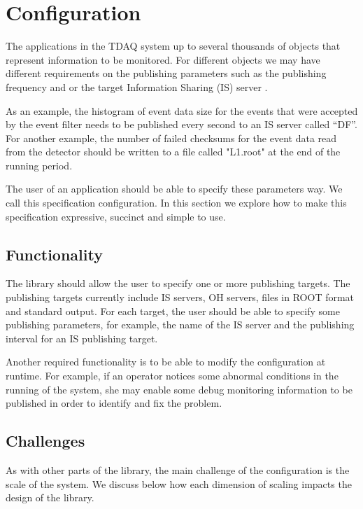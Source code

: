 \chapter{Configuration} %
\label{Capitolul3}

The applications in the TDAQ system up to several thousands of objects that represent information to be monitored. For different objects we may have different requirements on the publishing parameters such as the publishing frequency and or the target Information Sharing (IS) server \citep{kolosinformation}.

As an example, the histogram of event data size for the events that were accepted by the event filter needs to be published every second to an IS server called “DF”. For another example, the number of failed checksums for the event data read from the detector should be written to a file called "L1.root" at the end of the running period.

The user of an application should be able to specify these parameters way. We call this specification configuration. In this section we explore how to make this specification expressive,  succinct and simple to use.

\section*{Functionality}

The library should allow the user to specify one or more publishing targets. The publishing targets currently include IS servers, OH servers, files in ROOT \citep{brun1997root} format and standard output. For each target, the user should be able to specify some publishing parameters, for example, the name of the IS server and the publishing interval for an IS publishing target.

Another required functionality is to be able to modify the configuration at runtime. For example, if an operator notices some abnormal conditions in the running of the system, she may enable some debug monitoring information to be published in order to identify and fix the problem. 

\section*{Challenges}

As with other parts of the library, the main challenge of the configuration is the scale of the system. We discuss below how each dimension of scaling impacts the design of the library.

